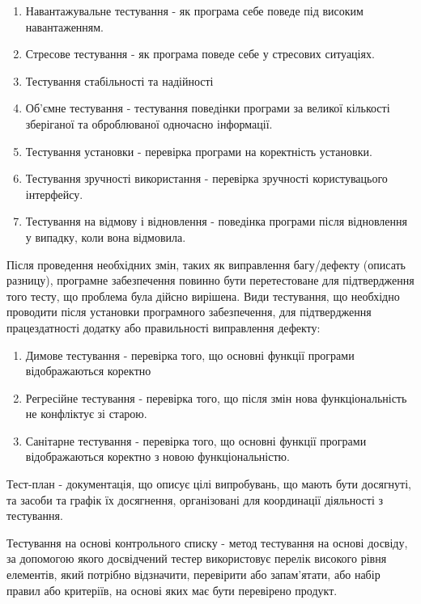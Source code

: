 \begin{enumerate}
\item Навантажувальне тестування - як програма себе поведе під високим навантаженням.
\item Стресове тестування - як програма поведе себе у стресових ситуаціях.
\item Тестування стабільності та надійності
\item Об'ємне тестування - тестування поведінки програми за великої кількості зберіганої та оброблюваної одночасно інформації.
\item Тестування установки - перевірка програми на коректність установки.
\item Тестування зручності використання - перевірка зручності користувацього інтерфейсу.
\item Тестування на відмову і відновлення - поведінка програми після відновлення у випадку, коли вона відмовила.
\end{enumerate}

Після проведення необхідних змін, таких як виправлення багу/дефекту (описать разницу), програмне забезпечення повинно бути перетестоване для підтвердження того тесту, що проблема була дійсно вирішена. Види тестування, що необхідно проводити після установки програмного забезпечення, для підтвердження працездатності додатку або правильності виправлення дефекту:

\begin{enumerate}
    \item Димове тестування - перевірка того, що основні функції програми відображаються коректно
    \item Регресійне тестування - перевірка того, що після змін нова функціональність не конфліктує зі старою.
    \item Санітарне тестування - перевірка того, що основні функції програми відображаються коректно з новою функціональністю.
\end{enumerate} 

Тест-план - документація, що описує цілі випробувань, що мають бути досягнуті, та засоби та графік їх досягнення, організовані для координації діяльності з тестування.

Тестування на основі контрольного списку - метод тестування на основі досвіду, за допомогою якого досвідчений тестер використовує перелік високого рівня елементів, який потрібно відзначити, перевірити або запам'ятати, або набір правил або критеріїв, на основі яких має бути перевірено продукт. \cite{istqb}

